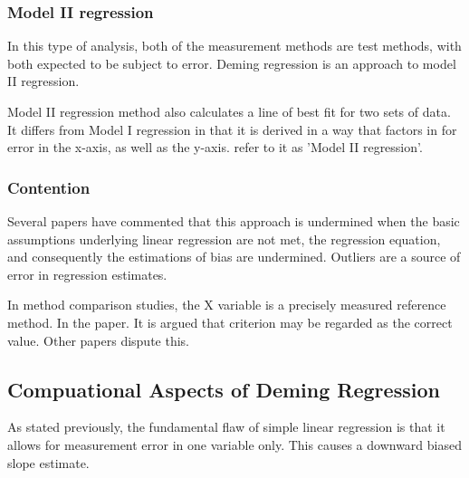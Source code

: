 \documentclass[12pt, a4paper]{report}
\theoremstyle{plain}
\theoremstyle{definition}
\theoremstyle{remark}
\begin{document}
	
	

	
	
	\subsubsection{Model II regression}
In this type of analysis, both of the measurement methods are test methods, with both expected to be subject to error. Deming regression is an approach to model II regression.
	
		Model II regression method also calculates a line of best fit for two sets of data. It differs from Model I regression in that it is derived in a way that factors in for error in the x-axis, as well as the y-axis. \citet{CornCoch} refer to it as 'Model II regression'.

	

	
	
	
	
	
	\subsubsection{Contention }
	Several papers have commented that this approach is undermined
	when the basic assumptions underlying linear regression are not
	met, the regression equation, and consequently the estimations of
	bias are undermined. Outliers are a source of error in regression
	estimates.
	
	
	In method comparison studies, the X variable is a precisely measured reference method. In the \citet{CornCoch} paper. It is argued that criterion may be regarded as the correct value. Other papers dispute this.
	
	
	
	

	
	
	
	
	
	\subsection{Compuational Aspects of Deming Regression}
	
	
	
	
	
	
	
	
	
	As stated previously, the fundamental flaw of simple linear regression is that it allows for measurement error in one variable only. This causes a downward biased slope estimate.
	
\end{document}
